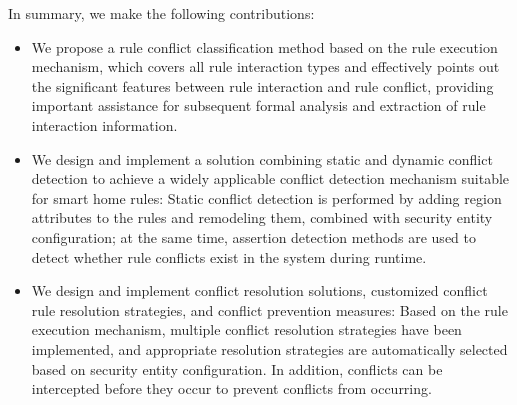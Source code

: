 In summary, we make the following contributions:

\begin{itemize}
	\item We propose a rule conflict classification method based on the rule execution mechanism, which covers all rule interaction types and effectively points out the significant features between rule interaction and rule conflict, providing important assistance for subsequent formal analysis and extraction of rule interaction information.
	
	\item We design and implement a solution combining static and dynamic conflict detection to achieve a widely applicable conflict detection mechanism suitable for smart home rules: Static conflict detection is performed by adding region attributes to the rules and remodeling them, combined with security entity configuration; at the same time, assertion detection methods are used to detect whether rule conflicts exist in the system during runtime.
	
	\item We design and implement conflict resolution solutions, customized conflict rule resolution strategies, and conflict prevention measures: Based on the rule execution mechanism, multiple conflict resolution strategies have been implemented, and appropriate resolution strategies are automatically selected based on security entity configuration. In addition, conflicts can be intercepted before they occur to prevent conflicts from occurring.
\end{itemize}
